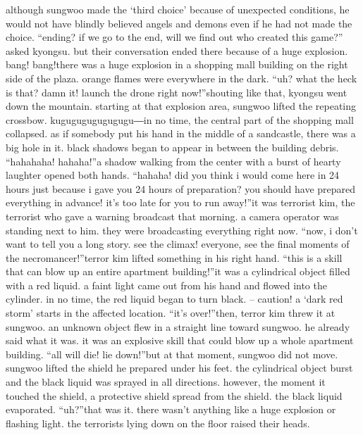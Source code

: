 although sungwoo made the ‘third choice’ because of unexpected conditions, he would not have blindly believed angels and demons even if he had not made the choice.
“ending? if we go to the end, will we find out who created this game?” asked kyongsu.
 but their conversation ended there because of a huge explosion.
bang! bang!there was a huge explosion in a shopping mall building on the right side of the plaza.
orange flames were everywhere in the dark.
“uh? what the heck is that? damn it! launch the drone right now!”shouting like that, kyongsu went down the mountain.
starting at that explosion area, sungwoo lifted the repeating crossbow.
kugugugugugugugu―in no time, the central part of the shopping mall collapsed.
 as if somebody put his hand in the middle of a sandcastle, there was a big hole in it.
 black shadows began to appear in between the building debris.
“hahahaha! hahaha!”a shadow walking from the center with a burst of hearty laughter opened both hands.
“hahaha! did you think i would come here in 24 hours just because i gave you 24 hours of preparation? you should have prepared everything in advance! it’s too late for you to run away!”it was terrorist kim, the terrorist who gave a warning broadcast that morning.
 a camera operator was standing next to him.
 they were broadcasting everything right now.
“now, i don’t want to tell you a long story.
 see the climax! everyone, see the final moments of the necromancer!”terror kim lifted something in his right hand.
“this is a skill that can blow up an entire apartment building!”it was a cylindrical object filled with a red liquid.
 a faint light came out from his hand and flowed into the cylinder.
 in no time, the red liquid began to turn black.
– caution! a ‘dark red storm’ starts in the affected location.
“it’s over!”then, terror kim threw it at sungwoo.
 an unknown object flew in a straight line toward sungwoo.
 he already said what it was.
 it was an explosive skill that could blow up a whole apartment building.
“all will die! lie down!”but at that moment, sungwoo did not move.
 sungwoo lifted the shield he prepared under his feet.
 the cylindrical object burst and the black liquid was sprayed in all directions.
 however, the moment it touched the shield, a protective shield spread from the shield.
the black liquid evaporated.
“uh?”that was it.
 there wasn’t anything like a huge explosion or flashing light.
the terrorists lying down on the floor raised their heads.


